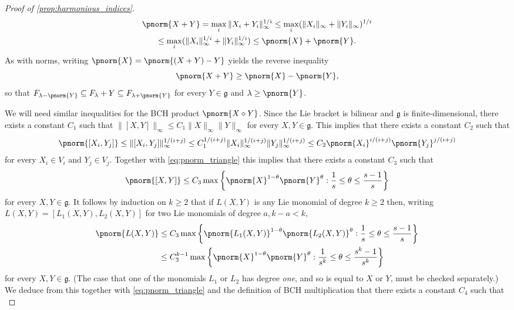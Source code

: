 \begin{proof}[Proof of \cref{prop:harmonious_indices}]
\begin{multline}
\pnorm{X+Y} = \max_i \|X_i+Y_i\|_\infty^{1/i} \leq \max_i (\|X_i\|_\infty+\|Y_i\|_\infty)^{1/i}  
\\\leq \max_i (\|X_i\|_\infty^{1/i}+\|Y_i\|_\infty^{1/i}) \leq \pnorm{X}+\pnorm{Y}.
\end{multline}
As with norms, writing $\pnorm{X} = \pnorm{(X+Y)-Y}$ yields the reverse inequality
\begin{equation}\label{eq:pnorm_reverse_triangle}\pnorm{X+Y} \geq \pnorm{X}-\pnorm{Y},\end{equation}
so that
$F_{\lambda-\pnorm{Y}} \subseteq F_\lambda + Y \subseteq F_{\lambda+\pnorm{Y}}$ for every $Y \in \mathfrak{g}$ and $\lambda \geq \pnorm{Y}$.

\medskip

We will need similar inequalities for the BCH product $\pnorm{X\diamond Y}$. Since the Lie bracket is bilinear and $\mathfrak{g}$ is finite-dimensional, there exists a constant $C_1$ such that $\|[X,Y]\|_\infty \leq C_1\|X\|_\infty \|Y\|_\infty$ for every $X,Y\in \mathfrak{g}$. This implies that there exists a constant $C_2$ such that
%
%
%
%
%
%
\[
\pnorm{[X_i,Y_j]} \leq \|[X_i,Y_j]\|_\infty^{1/(i+j)} \leq C_1^{1/(i+j)}\|X_i\|_\infty^{1/(i+j)}\|Y_j\|_\infty^{1/(i+j)} \leq C_2 \pnorm{X_i}^{i/(i+j)}\pnorm{Y_j}^{j/(i+j)}
\]
for every $X_i\in V_i$ and $Y_j \in V_j$. Together with \eqref{eq:pnorm_triangle} this implies that there exists a constant $C_3$ such that
\[
\pnorm{[X,Y]} \leq C_3 \max\left\{\pnorm{X}^{1-\theta}\pnorm{Y}^{\theta}:\frac{1}{s}\leq \theta \leq \frac{s-1}{s}\right\}
\]
for every $X,Y\in \mathfrak{g}$. It follows by induction on $k\geq 2$ that if $L(X,Y)$ is any Lie monomial of degree $k \geq 2$ then, writing $L(X,Y)=[L_1(X,Y),L_2(X,Y)]$ for two Lie monomials of degree $a,k-a<k$,
\begin{align*}
\pnorm{L(X,Y)} &\leq 
C_3 \max\left\{\pnorm{L_1(X,Y)}^{1-\theta}\pnorm{L_2(X,Y)}^{\theta}: \frac{1}{s} \leq \theta \leq \frac{s-1}{s}\right\}
\\&\leq
C^{k-1}_3 \max\left\{\pnorm{X}^{1-\theta}\pnorm{Y}^{\theta}:\frac{1}{s^k} \leq \theta \leq \frac{s^k-1}{s^k}\right\}
\end{align*}
for every $X,Y\in \mathfrak{g}$. (The case that one of the monomials $L_1$ or $L_2$ has degree \emph{one}, and so is equal to $X$ or $Y$, must be checked separately.) We deduce from this together with \eqref{eq:pnorm_triangle} and the definition of BCH multiplication that there exists a constant $C_4$ such that
\begin{equation}
\label{eq:pnorm_BCH_triangle}

\end{equation}
\end{proof}
